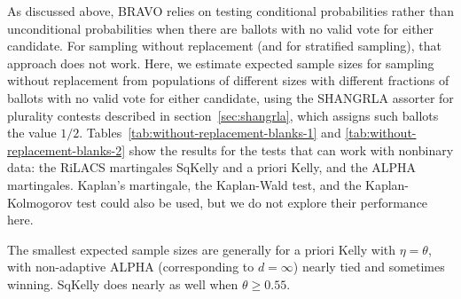 \documentclass[12pt,runningheads]{llncs}
\begin{document}
{As discussed above, BRAVO relies on testing conditional probabilities
rather than unconditional probabilities when there are ballots with no valid vote for either candidate.
For sampling without replacement (and for stratified sampling), that approach does not work.
Here, we estimate expected sample sizes for sampling without replacement from populations of different sizes
with different fractions of ballots with no valid vote for either candidate, using the SHANGRLA assorter for plurality
contests described in section~\ref{sec:shangrla}, which assigns such ballots the value $1/2$.
Tables~\ref{tab:without-replacement-blanks-1} and \ref{tab:without-replacement-blanks-2} show the
 results for the tests that can work with nonbinary data:
the RiLACS martingales SqKelly and a priori Kelly, and the ALPHA martingales. 
Kaplan's martingale, the Kaplan-Wald test, and the Kaplan-Kolmogorov test \cite{stark09b,stark20} could also be used, but we do not explore their performance here.

The smallest expected sample sizes are generally for a priori Kelly with $\eta=\theta$, with non-adaptive ALPHA (corresponding to
$d=\infty$) nearly tied and sometimes winning.
SqKelly does nearly as well when $\theta \ge 0.55$.

}
\end{document}
